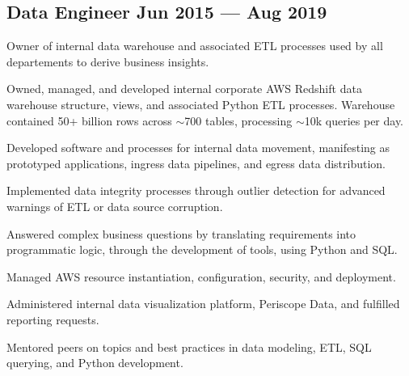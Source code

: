 \documentclass[letter,10pt]{article}
\begin{document}

\subsection{{Data Engineer \hfill Jun 2015 --- Aug 2019}}

\vspace{10pt}

Owner of internal data warehouse and associated ETL processes used by all departements to derive business insights.


\vspace{10pt}

\begin{zitemize}
    \item Owned, managed, and developed internal corporate AWS Redshift data warehouse structure, views, and associated Python ETL processes. Warehouse contained 50+ billion rows across $\sim$700 tables, processing $\sim$10k queries per day.
    \item Developed software and processes for internal data movement, manifesting as prototyped applications, ingress data pipelines, and egress data distribution.
    \item Implemented data integrity processes through outlier detection for advanced warnings of ETL or data source corruption.
    \item Answered complex business questions by translating requirements into programmatic logic, through the development of tools, using Python and SQL.
    \item Managed AWS resource instantiation, configuration, security, and deployment.
    \item Administered internal data visualization platform, Periscope Data, and fulfilled reporting requests.
    \item Mentored peers on topics and best practices in data modeling, ETL, SQL querying, and Python development.
\end{zitemize}
\end{document}
